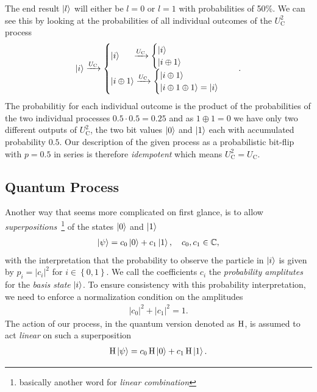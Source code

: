 The end result $\ket{l}$ will either be $l=0$ or $l=1$ with probabilities of 50\%. We can see this by looking at the probabilities of all individual outcomes of the $U^2_\text{C}$ process
\begin{align}
      \ket{i} \xrightarrow{U_\text{C}} \begin{cases} \ket{i}\phantom{\oplus 0}
      \xrightarrow{U_\text{C}}
      \begin{cases} \ket{i}\phantom{\oplus 0}  \\ \ket{i \oplus 1} \end{cases} \\ \ket{i \oplus 1} \xrightarrow{U_\text{C}} \begin{cases} \ket{i\oplus 1} \\ \ket{i \oplus 1 \oplus 1} =\ket{i} \end{cases}  \end{cases}.  
\end{align}
The probabilitiy for each individual outcome is the product of the probabilities of the two individual processes $0.5\cdot 0.5 = 0.25$ and as $1\oplus 1 = 0$ we have only two different outputs of $U^2_\text{C}$, the two bit values $\ket{0}$ and $\ket{1}$ each with accumulated probability $0.5$. Our description of the given process as a probabilistic bit-flip with $p=0.5$ in series is therefore \textit{idempotent} which means $U_\text{C}^2 = U_\text{C}$.

\subsection{Quantum Process}

Another way that seems more complicated on first glance, is to allow \textit{superpositions}~\footnote{basically another word for \textit{linear combination}} of the states $\ket{0}$ and $\ket{1}$
\begin{align}
    \ket{\psi} = c_0\ket{0} + c_1\ket{1},\quad c_0,c_1\in \mathbb{C},
\end{align}
with the interpretation that the probability to observe the particle in $\ket{i}$ is given by $p_i = |c_i|^2$ for $i\in\left\{0,1\right\}$. We call the coefficients $c_i$ the \textit{probability amplitutes} for the \textit{basis state} $\ket{i}$. 
To ensure consistency with this probability interpretation, we need to enforce a normalization condition on the amplitudes
\begin{align}
    |c_0 |^2 + | c_1 |^2 = 1. 
\end{align}
The action of our process, in the quantum version denoted as $\operatorname{H}$, is assumed to act \textit{linear} on such a superposition
\begin{align}
    \operatorname{H}\ket{\psi} = c_0 \operatorname{H}\ket{0} + c_1 \operatorname{H}\ket{1}.
\end{align}

